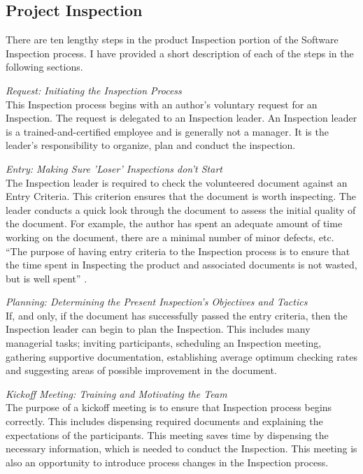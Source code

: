 \subsection{Project Inspection}
There are ten lengthy steps in the product Inspection portion of the
Software Inspection process. I have provided a short description of each of
the steps in the following sections.

\begin{flushleft}
  \textit{Request: Initiating the Inspection Process} \\ This
  Inspection process begins with an author's voluntary request for an
  Inspection. The request is delegated to an Inspection leader. An
  Inspection leader is a trained-and-certified employee and is generally
  not a manager. It is the leader's responsibility to organize, plan and
  conduct the inspection.
\end{flushleft}

\begin{flushleft}
  \textit{Entry: Making Sure 'Loser' Inspections don't Start} \\ The
  Inspection leader is required to check the volunteered document against
  an Entry Criteria. This criterion ensures that the document is worth
  inspecting. The leader conducts a quick look through the document to
  assess the initial quality of the document. For example, the author has
  spent an adequate amount of time working on the document, there are a
  minimal number of minor defects, etc. ``The purpose of having entry
  criteria to the Inspection process is to ensure that the time spent in
  Inspecting the product and associated documents is not wasted, but is
  well spent'' \cite{Gilb93}.
\end{flushleft}

\begin{flushleft}
  \textit{Planning: Determining the Present Inspection's Objectives and
    Tactics} \\ If, and only, if the document has successfully passed the
  entry criteria, then the Inspection leader can begin to plan the
  Inspection. This includes many managerial tasks; inviting participants,
  scheduling an Inspection meeting, gathering supportive documentation,
  establishing average optimum checking rates and suggesting areas of
  possible improvement in the document.
\end{flushleft}

\begin{flushleft}
  \textit{Kickoff Meeting: Training and Motivating the Team} \\ The purpose
  of a kickoff meeting is to ensure that Inspection process begins
  correctly. This includes dispensing required documents and explaining the
  expectations of the participants. This meeting saves time by dispensing
  the necessary information, which is needed to conduct the Inspection.
  This meeting is also an opportunity to introduce process changes in the
  Inspection process.
\end{flushleft}

